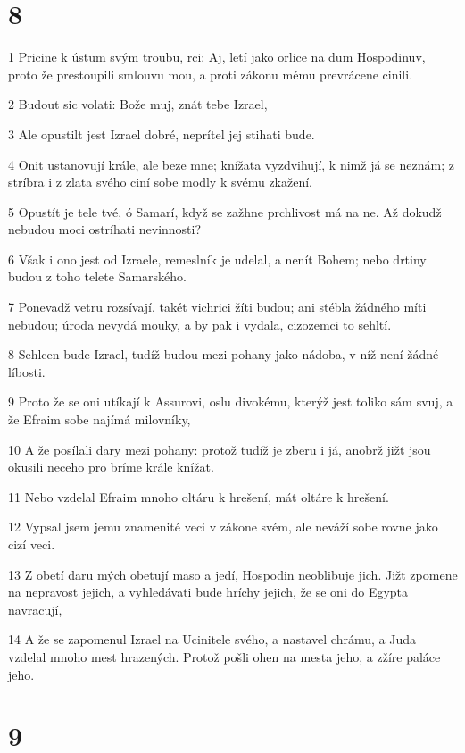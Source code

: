 \chapter{8}

\par 1 Pricine k ústum svým troubu, rci: Aj, letí jako orlice na dum Hospodinuv, proto že prestoupili smlouvu mou, a proti zákonu mému prevrácene cinili.
\par 2 Budout sic volati: Bože muj, znát tebe Izrael,
\par 3 Ale opustilt jest Izrael dobré, neprítel jej stihati bude.
\par 4 Onit ustanovují krále, ale beze mne; knížata vyzdvihují, k nimž já se neznám; z stríbra i z zlata svého ciní sobe modly k svému zkažení.
\par 5 Opustít je tele tvé, ó Samarí, když se zažhne prchlivost má na ne. Až dokudž nebudou moci ostríhati nevinnosti?
\par 6 Však i ono jest od Izraele, remeslník je udelal, a nenít Bohem; nebo drtiny budou z toho telete Samarského.
\par 7 Ponevadž vetru rozsívají, takét vichrici žíti budou; ani stébla žádného míti nebudou; úroda nevydá mouky, a by pak i vydala, cizozemci to sehltí.
\par 8 Sehlcen bude Izrael, tudíž budou mezi pohany jako nádoba, v níž není žádné líbosti.
\par 9 Proto že se oni utíkají k Assurovi, oslu divokému, kterýž jest toliko sám svuj, a že Efraim sobe najímá milovníky,
\par 10 A že posílali dary mezi pohany: protož tudíž je zberu i já, anobrž jižt jsou okusili neceho pro bríme krále knížat.
\par 11 Nebo vzdelal Efraim mnoho oltáru k hrešení, mát oltáre k hrešení.
\par 12 Vypsal jsem jemu znamenité veci v zákone svém, ale neváží sobe rovne jako cizí veci.
\par 13 Z obetí daru mých obetují maso a jedí, Hospodin neoblibuje jich. Jižt zpomene na nepravost jejich, a vyhledávati bude hríchy jejich, že se oni do Egypta navracují,
\par 14 A že se zapomenul Izrael na Ucinitele svého, a nastavel chrámu, a Juda vzdelal mnoho mest hrazených. Protož pošli ohen na mesta jeho, a zžíre paláce jeho.

\chapter{9}

